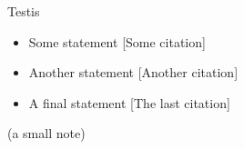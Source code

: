 \begin{frame}{\color{labsixorange} Testis}

	\begin{itemize}
		\item Some statement {\color{gray} [Some citation]}
		\item Another statement {\color{gray} [Another citation]}
		\item A final statement {\color{gray} [The last citation]}
	\end{itemize}

	\vspace{3ex}
	\begin{center}
		\scriptsize (a small note)
	\end{center}

\end{frame}

